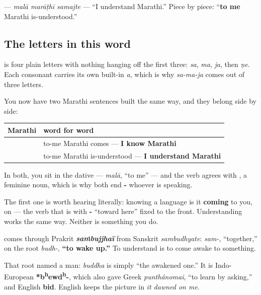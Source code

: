 \textbf{  } — \emph{malā marāṭhī samajte} — \textquotedblleft{}I understand Marathi.\textquotedblright{} Piece by piece: \textquotedblleft{}\textbf{to me} Marathi is-understood.\textquotedblright{}

\subsection*{The letters in this word}
\textbf{} is four plain letters with nothing hanging off the first three: \textbf{} \emph{sa}, \textbf{} \emph{ma}, \textbf{} \emph{ja}, then \textbf{} \emph{ṇe}. Each consonant carries its own built-in \emph{a}, which is why \emph{sa-ma-ja} comes out of three letters.

\begin{grammarlens}[title={Grammar Lens: three verbs, one frame}]
You now have two Marathi sentences built the same way, and they belong side by side:

\noindent
\begin{tabularx}{\linewidth}{@{}>{\raggedright\arraybackslash}X>{\raggedright\arraybackslash}X@{}}
\toprule
\textbf{Marathi} & \textbf{word for word} \\
\midrule
\mr{मला} \mr{मराठी} \mr{येते} & to-me Marathi comes — \textbf{I know Marathi} \\
\mr{मला} \mr{मराठी} \mr{समजते} & to-me Marathi is-understood — \textbf{I understand Marathi} \\
\bottomrule
\end{tabularx}

In both, you sit in the dative — \emph{malā}, \textquotedblleft{}to me\textquotedblright{} — and the verb agrees with \textbf{}, a feminine noun, which is why both end \textbf{-} whoever is speaking.

The first one is worth hearing literally: knowing a language is it \textbf{coming} to you, on \textbf{} — the verb that is \textbf{} with \textbf{-} \textquotedblleft{}toward here\textquotedblright{} fixed to the front. Understanding works the same way. Neither is something you do.
\end{grammarlens}

\begin{cousinweb}
\textbf{} comes through Prakrit \emph{\textbf{saṁbujjhaï}} from Sanskrit \textbf{} \emph{sambudhyate}: \textbf{} \emph{sam-}, \textquotedblleft{}together,\textquotedblright{} on the root \textbf{} \emph{budh-}, \textbf{\textquotedblleft{}to wake up.\textquotedblright{}} To understand is to come awake to something.

That root named a man: \textbf{} \emph{buddha} is simply \textquotedblleft{}the awakened one.\textquotedblright{} It is Indo-European \textbf{*b\textsuperscript{h}ewd\textsuperscript{h}-}, which also gave Greek \emph{punthánomai}, \textquotedblleft{}to learn by asking,\textquotedblright{} and English \textbf{bid}. English keeps the picture in \emph{it dawned on me}.
\end{cousinweb}

